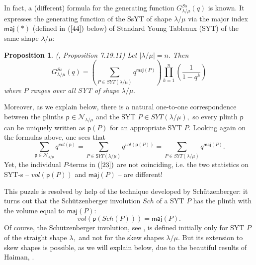 \documentclass[12pt]{article}%
\newtheorem{proposition}[theorem]{Proposition}
\begin{document}
In fact, a (different) formula for the generating function $G_{\lambda/\mu
}^{Ss}\left(  q\right)  $ is known. It expresses the generating function of
the SsYT of shape $\lambda/\mu$ via the major index $\mathsf{maj}(\ast)$
(defined in $\left(  \ref{44}\right)  $ below) of Standard Young Tableaux
(SYT) of the same shape $\lambda/\mu$:

\begin{proposition}
(\cite{St}, Proposition 7.19.11) Let $\left\vert \lambda/\mu\right\vert =n.$
Then%
\begin{equation}
G_{\lambda/\mu}^{Ss}\left(  q\right)  =\left(  \sum_{P\in SYT\left(
\lambda/\mu\right)  }q^{\mathsf{maj}\left(  P\right)  }\right)  \prod
_{k=1}^{n}\left(  \frac{1}{1-q^{k}}\right)  \label{21}%
\end{equation}
where $P$ ranges over all SYT of shape $\lambda/\mu.$
\end{proposition}

Moreover, as we explain below, there is a natural one-to-one correspondence
between the plinths $\mathsf{p}\in\mathcal{N}_{\lambda/\mu}$ and the SYT $P\in
SYT\left(  \lambda/\mu\right)  ,$ so every plinth $\mathsf{p}$ can be uniquely
written as $\mathsf{p}\left(  P\right)  $ for an appropriate SYT  $P.$ Looking
again on the formulas above, one sees that
\begin{equation}
\sum_{\mathsf{p}\in\mathcal{N}_{\lambda/\mu}}q^{vol\left(  \mathsf{p}\right)
}=\sum_{P\in\mathsf{S}YT\left(  \lambda/\mu\right)  }q^{vol\left(
\mathsf{p}\left(  P\right)  \right)  }=\sum_{P\in SYT\left(  \lambda
/\mu\right)  }q^{\mathsf{maj}\left(  P\right)  }.\label{23}%
\end{equation}
Yet, the individual $P$-terms in $\left(  \ref{23}\right)  $ are not
coinciding, i.e. the two statistics on SYT-s -- $vol\left(  \mathsf{p}\left(
P\right)  \right)  $ and $\mathsf{maj}\left(  P\right)  $ -- are different! 

This puzzle is resolved by help of the technique developed by
Sch\"{u}tzenberger: it turns out that the Sch\"{u}tzenberger involution $Sch$
of a SYT $P$ has the plinth with the volume equal to $\mathsf{maj}\left(
P\right)  :$%
\begin{equation}
vol\left(  \mathsf{p}\left(  Sch\left(  P\right)  \right)  \right)
=\mathsf{maj}\left(  P\right)  .\label{71}%
\end{equation}
Of course, the Sch\"{u}tzenberger involution, see \cite{Sch}, is defined
initially only for SYT $P$ of the straight shape $\lambda,$ and not for the
skew shapes $\lambda/\mu.$ But its extension to skew shapes is possible, as we
will explain below, due to the beautiful results of Haiman, \cite{H}.
\end{document}

